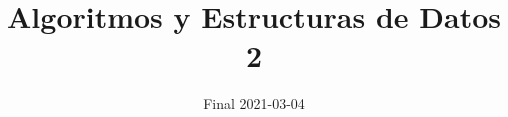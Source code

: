 

\title{Algoritmos y Estructuras de Datos 2}
\author{Final 2021-03-04}
\date{}



\maketitle









